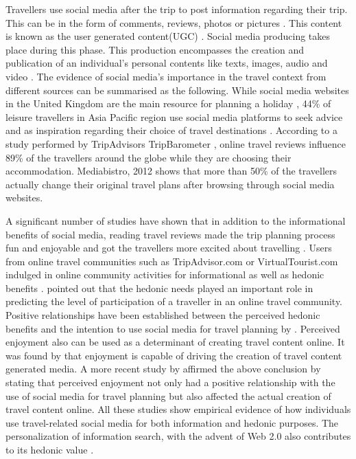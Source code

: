 Travellers use social media after the trip to post information regarding their trip. This can be in the form of comments, reviews, photos or pictures \cite{fotis2012social}\cite{parra2012travellers}. This content is known as the user generated content(UGC) \cite{simms2012online}. Social media producing takes place during this phase. This production encompasses the creation and publication of an individual's personal contents like texts, images, audio and video \cite{Shao, 2009}. The evidence of social media’s importance in the travel context from different sources can be summarised as the following. While social media websites in the United Kingdom are the main resource for planning a holiday \cite{World Travel Market, 2013}, 44\% of leisure travellers in Asia Pacific region use social media platforms to seek advice and as inspiration regarding their choice of travel destinations \cite{eMarketer, 2013}. According to a study performed by TripAdvisor\textquotesingle s TripBarometer \cite{2014b}, online travel reviews influence 89\% of the travellers around the globe while they are choosing their accommodation. Mediabistro, 2012 shows that more than 50\% of the travellers actually change their original travel plans after browsing through social media websites.

A significant number of studies have shown that in addition to the informational benefits of social media, reading travel reviews made the trip planning process fun and enjoyable and got the travellers more excited about travelling \cite{10.1007/978-3-211-77280-5_4}\cite{gretzel2007online} \cite{parra2012travellers}. Users from online travel communities such as TripAdvisor.com or VirtualTourist.com indulged in online community activities for informational as well as hedonic benefits \cite{chung2008web}. \cite{doi:10.1177/0047287503258824} pointed out that the hedonic needs played an important role in predicting the level of participation of a traveller in an online travel community. Positive relationships have been established between the perceived hedonic benefits and the intention to use social media for travel planning by \cite{ayeh2013predicting}.  Perceived enjoyment also can be used as a determinant of creating travel content online. It was found by \cite{YOO2011609} that enjoyment is capable of driving the creation of travel content generated media. A more recent study by \cite{doi:10.1080/10548408.2013.751237} affirmed the above conclusion by stating that perceived enjoyment not only had a positive relationship with the use of social media for travel planning but also affected the actual creation of travel content online.
All these studies show empirical evidence of how individuals use travel-related social media for both information and hedonic purposes. The personalization of information search, with the advent of Web 2.0 also contributes to its hedonic value \cite{doi:10.1080/14616688.2012.762542}.


